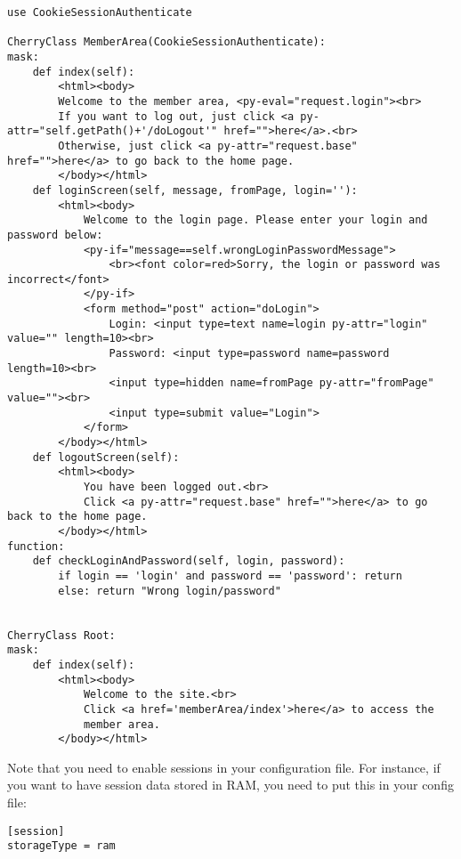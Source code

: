 \begin{verbatim}
use CookieSessionAuthenticate

CherryClass MemberArea(CookieSessionAuthenticate):
mask:
    def index(self):
        <html><body>
        Welcome to the member area, <py-eval="request.login"><br>
        If you want to log out, just click <a py-attr="self.getPath()+'/doLogout'" href="">here</a>.<br>
        Otherwise, just click <a py-attr="request.base" href="">here</a> to go back to the home page.
        </body></html>
    def loginScreen(self, message, fromPage, login=''):
        <html><body>
            Welcome to the login page. Please enter your login and password below:
            <py-if="message==self.wrongLoginPasswordMessage">
                <br><font color=red>Sorry, the login or password was incorrect</font>
            </py-if>
            <form method="post" action="doLogin">
                Login: <input type=text name=login py-attr="login" value="" length=10><br>
                Password: <input type=password name=password length=10><br>
                <input type=hidden name=fromPage py-attr="fromPage" value=""><br>
                <input type=submit value="Login">
            </form>
        </body></html>
    def logoutScreen(self):
        <html><body>
            You have been logged out.<br>
            Click <a py-attr="request.base" href="">here</a> to go back to the home page.
        </body></html>
function:
    def checkLoginAndPassword(self, login, password):
        if login == 'login' and password == 'password': return
        else: return "Wrong login/password"
        

CherryClass Root:
mask:
    def index(self):
        <html><body>
            Welcome to the site.<br>
            Click <a href='memberArea/index'>here</a> to access the
            member area.
        </body></html>
\end{verbatim}

Note that you need to enable sessions in your configuration file. For instance, if you want to have session data stored
in RAM, you need to put this in your config file:

\begin{verbatim}
[session]
storageType = ram
\end{verbatim}

